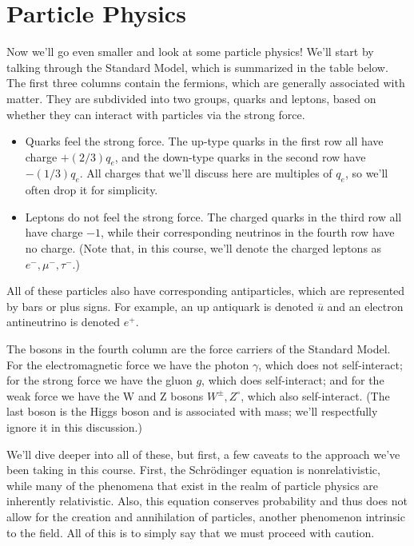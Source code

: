 \documentclass[../p052main.tex]{subfiles}
\begin{document}
\section{Particle Physics}%
Now we'll go even smaller and look at some particle physics!
We'll start by talking through the Standard Model, which is summarized in the table below.
The first three columns contain the fermions, which are generally associated with matter.
They are subdivided into two groups, quarks and leptons, based on whether they can interact with particles via the strong force.
\begin{itemize}
    \item Quarks feel the strong force.
    The up-type quarks in the first row all have charge $+(2 / 3)q_e$, and the down-type quarks in the second row have $-(1 / 3)q_e$.
    All charges that we'll discuss here are multiples of $q_e$, so we'll often drop it for simplicity.

    \item Leptons do not feel the strong force.
    The charged quarks in the third row all have charge $-1$, while their corresponding neutrinos in the fourth row have no charge.
    (Note that, in this course, we'll denote the charged leptons as $e^-, \mu^-, \tau^-$.)
\end{itemize}
All of these particles also have corresponding antiparticles, which are represented by bars or plus signs.
For example, an up antiquark is denoted $\overline{u}$ and an electron antineutrino is denoted $e^+$.

The bosons in the fourth column are the force carriers of the Standard Model.
For the electromagnetic force we have the photon $\gamma$, which does not self-interact; for the strong force we have the gluon $g$, which does self-interact; and for the weak force we have the W and Z bosons $W^\pm, Z^\circ$, which also self-interact.
(The last boson is the Higgs boson and is associated with mass; we'll respectfully ignore it in this discussion.)

We'll dive deeper into all of these, but first, a few caveats to the approach we've been taking in this course.
First, the Schrödinger equation is nonrelativistic, while many of the phenomena that exist in the realm of particle physics are inherently relativistic.
Also, this equation conserves probability and thus does not allow for the creation and annihilation of particles, another phenomenon intrinsic to the field.
All of this is to simply say that we must proceed with caution.
\end{document}

